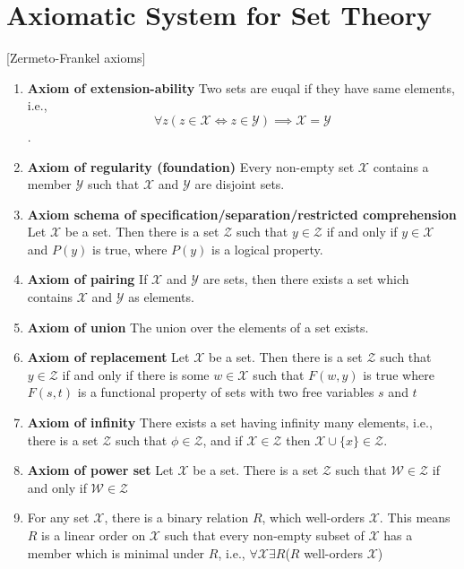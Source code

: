 \documentclass[a4paper,english,12pt]{article}
\begin{document}
\section{Axiomatic System for Set Theory}[Zermeto-Frankel axioms]
\begin{enumerate}
 \item \textbf{Axiom of extension-ability} Two sets are euqal if they have same elements, i.e.,
 $$\forall z (z\in \mathcal{X} \Leftrightarrow z\in \mathcal{Y})\implies \mathcal{X}=\mathcal{Y}$$.
 \item \textbf{Axiom of regularity (foundation)} Every non-empty set $\mathcal{X}$ contains a member $\mathcal{Y}$ such that
 $\mathcal{X}$ and $\mathcal{Y}$ are disjoint sets. 
 \item \textbf{Axiom schema of specification/separation/restricted comprehension} Let $\mathcal{X}$ be a set. Then
there is a set $\mathcal{Z}$ such that $y \in\mathcal{Z}$ if and only if $y \in \mathcal{X}$ and $P(y)$ is true, where $P(y)$ is a logical property. 
 \item \textbf{Axiom of pairing} If $\mathcal{X}$ and $\mathcal{Y}$ are sets, then there exists a set which contains $\mathcal{X}$ and $\mathcal{Y}$ as elements. 
 \item \textbf{Axiom of union} The union over the elements of a set exists. 
 \item \textbf{Axiom of replacement} Let $\mathcal{X}$ be a set. Then there is a set $\mathcal{Z}$ such that $y\in \mathcal{Z}$ if and only if there is some $w \in \mathcal{X}$ such that $F(w, y)$ is true where $F(s, t)$ is a functional property of sets with two free variables $s$ and $t$ 
 \item \textbf{Axiom of infinity} There exists a set having infinity many elements, i.e., there is a set $\mathcal{Z}$ such that $\phi  \in \mathcal{Z}$, and if $\mathcal{X} ∈ \mathcal{Z}$ then $\mathcal{X} ∪ \{x\} ∈ \mathcal{Z}$.
\item \textbf{Axiom of power set} Let $\mathcal{X}$ be a set. There is a set $\mathcal{Z}$ such that $\mathcal{W}\in\mathcal{Z}$ if and only if $\mathcal{W}\in \mathcal{Z}$
\item For any set $\mathcal{X}$, there is a binary relation $R$, which well-orders $\mathcal{X}$. This means $R$ is a linear order on $\mathcal{X}$ such that every non-empty subset of $\mathcal{X}$ has a member which is minimal under $R$, i.e., $\forall \mathcal{X}\exists R $($R$ well-orders $\mathcal{X}$)
 \end{enumerate}
\end{document}
